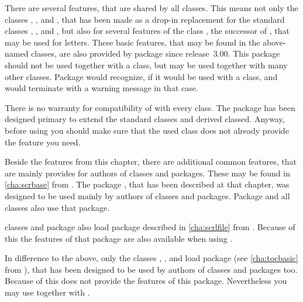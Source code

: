 There are several features, that are shared by all \KOMAScript{} classes. This
means not only the classes , , and
, that has been made as a drop-in replacement for the standard
classes , , and , but also for
several features of the \KOMAScript{} class , the successor of
, that may be used for letters. These basic features, that may
be found in the above-named classes, are also provided by package
 since \KOMAScript{} release~3.00. This package should not
be used together with a \KOMAScript{} class, but may be used together with
many other classes. Package  would recognize, if it would
be used with a \KOMAScript{} class, and would terminate with a warning message
in that case.

There is no warranty for compatibility of  with every
class. The package has been designed primary to extend the standard classes
and derived classed. Anyway, before using  you should
make sure that the used class does not already provide the feature you need.

Beside the features from this chapter, there are additional common features,
that are mainly provides for authors of classes and packages. These may be
found in \autoref{cha:scrbase} from . The package
, that has been described at
that chapter, was designed to be used mainly by authors of classes and
packages. Package  and all \KOMAScript{} classes also use
that package.

\KOMAScript{} classes and package  also load package
 described in
\autoref{cha:scrlfile} from . Because of this the
features of that package are also available when using .

\iftrue %
In difference to the above, only the \KOMAScript{} classes ,
, and  load package  (see
\autoref{cha:tocbasic} from ), that has been
designed to be used by authors of classes and packages too. Because of this
 does not provide the features of this package. Nevertheless
you may use  together with .%
\fi


